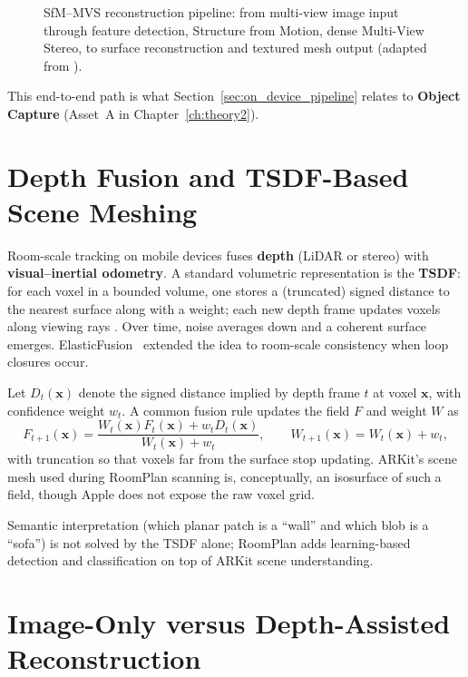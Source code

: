 \begin{figure}[htbp]
\centering
{}
\caption{SfM--MVS reconstruction pipeline: from multi-view image input through feature detection, Structure from Motion, dense Multi-View Stereo, to surface reconstruction and textured mesh output (adapted from \cite{Kholil_2021}).}
\label{fig:ch2_photo_pipeline}
\end{figure}

This end-to-end path is what Section~\ref{sec:on_device_pipeline} relates to \textbf{Object Capture} (Asset~A in Chapter~\ref{ch:theory2}).

\section{Depth Fusion and TSDF-Based Scene Meshing}
\label{sec:depth_fusion}

Room-scale tracking on mobile devices fuses \textbf{depth} (LiDAR or stereo) with \textbf{visual--inertial odometry}. A standard volumetric representation is the \textbf{TSDF}: for each voxel in a bounded volume, one stores a (truncated) signed distance to the nearest surface along with a weight; each new depth frame updates voxels along viewing rays \cite{newcombe2011kinectfusion}. Over time, noise averages down and a coherent surface emerges. ElasticFusion~\cite{whelan2016elasticfusion} extended the idea to room-scale consistency when loop closures occur.

Let $D_t(\mathbf{x})$ denote the signed distance implied by depth frame $t$ at voxel $\mathbf{x}$, with confidence weight $w_t$. A common fusion rule updates the field $F$ and weight $W$ as
\[
  F_{t+1}(\mathbf{x}) = \frac{W_t(\mathbf{x}) F_t(\mathbf{x}) + w_t D_t(\mathbf{x})}{W_t(\mathbf{x}) + w_t},
  \qquad
  W_{t+1}(\mathbf{x}) = W_t(\mathbf{x}) + w_t,
\]
with truncation so that voxels far from the surface stop updating. ARKit's scene mesh used during RoomPlan scanning is, conceptually, an isosurface of such a field, though Apple does not expose the raw voxel grid.

Semantic interpretation (which planar patch is a ``wall'' and which blob is a ``sofa'') is not solved by the TSDF alone; RoomPlan adds learning-based detection and classification on top of ARKit scene understanding.

\section{Image-Only versus Depth-Assisted Reconstruction}
\label{sec:depth_vs_photo}


